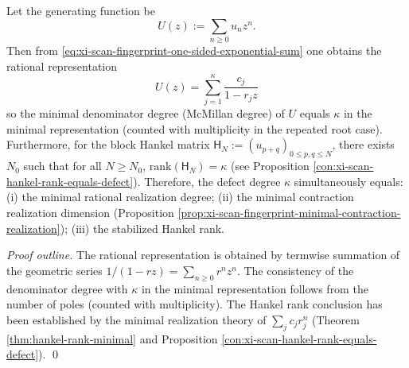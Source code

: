 \begin{corollary}\label{cor:xi-scan-fingerprint-mcmillan-degree-hankel-rank}
Let the generating function be
\[
U(z):=\sum_{n\ge 0}u_n z^n.
\]
Then from \eqref{eq:xi-scan-fingerprint-one-sided-exponential-sum} one obtains the rational representation
\[
\boxed{\;
U(z)=\sum_{j=1}^{\kappa}\frac{c_j}{1-r_j z}\;}
\]
so the minimal denominator degree (McMillan degree) of \(U\) equals \(\kappa\) in the minimal representation (counted with multiplicity in the repeated root case).
Furthermore, for the block Hankel matrix
\(
\mathsf{H}_N:=(u_{p+q})_{0\le p,q\le N}
\),
there exists \(N_0\) such that for all \(N\ge N_0\), \(\mathrm{rank}(\mathsf{H}_N)=\kappa\) (see Proposition \ref{con:xi-scan-hankel-rank-equals-defect}).
Therefore, the defect degree \(\kappa\) simultaneously equals:
(i) the minimal rational realization degree;
(ii) the minimal contraction realization dimension (Proposition \ref{prop:xi-scan-fingerprint-minimal-contraction-realization});
(iii) the stabilized Hankel rank.
\end{corollary}
\begin{proof}[Proof outline]
The rational representation is obtained by termwise summation of the geometric series \(1/(1-rz)=\sum_{n\ge 0}r^n z^n\).
The consistency of the denominator degree with \(\kappa\) in the minimal representation follows from the number of poles (counted with multiplicity).
The Hankel rank conclusion has been established by the minimal realization theory of \(\sum_j c_j r_j^n\) (Theorem \ref{thm:hankel-rank-minimal} and Proposition \ref{con:xi-scan-hankel-rank-equals-defect}). \qed
\end{proof}

